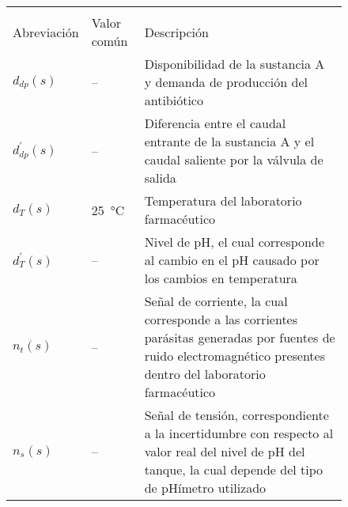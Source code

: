 \begin{figure}[!h]
    \centering
    \setlength\extrarowheight{3mm}
    \begin{tabular}{>{\centering\arraybackslash}p{3cm}>{\centering\arraybackslash}p{3cm}p{10cm}}
        \toprule\\[-2.5em]
        Abreviación & Valor común &Descripción\\
        \midrule
        $d_{dp}(s)$ & -- & Disponibilidad de la sustancia A y demanda de producción del antibiótico\\
        $d ^{\prime} _{dp}(s)$ & -- & Diferencia entre el caudal entrante de la sustancia A y el caudal saliente por la válvula de salida\\
        $d _{T}(s)$ & \SI{25}{\celsius}& Temperatura del laboratorio farmacéutico\\
        $d ^{\prime} _{T}(s)$ & -- & Nivel de pH, el cual corresponde al cambio en el pH causado por los cambios en temperatura\\
        $n_t(s)$ & -- & Señal de corriente, la cual corresponde a las corrientes parásitas generadas por fuentes de ruido electromagnético presentes dentro del laboratorio farmacéutico\\
        $n_s(s)$ & -- & Señal de tensión, correspondiente a la incertidumbre con respecto al valor real del nivel de pH del tanque, la cual depende del tipo de pHímetro utilizado\\
        \bottomrule
    \end{tabular}
    \label{t3}
\end{figure}

